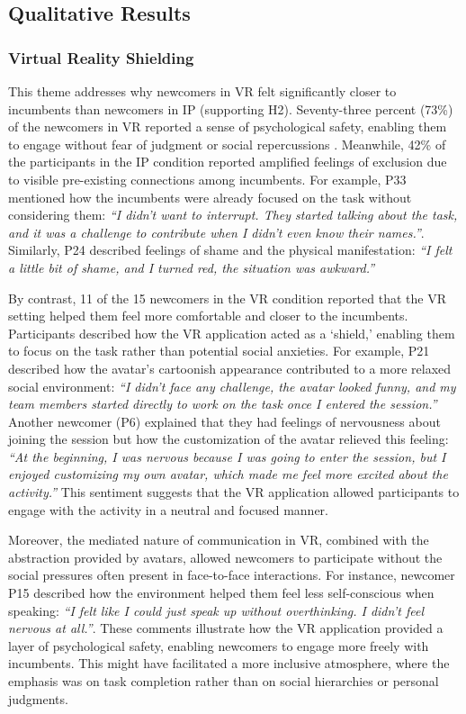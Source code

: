 \subsection{Qualitative Results}

\subsubsection{Virtual Reality Shielding}
This theme addresses why newcomers in VR felt significantly closer to incumbents than newcomers in IP (supporting H2). Seventy-three percent (73\%) of the newcomers in VR reported a sense of psychological safety, enabling them to engage without fear of judgment or social repercussions \cite{edmondson2014psychological}. Meanwhile, 42\% of the participants in the IP condition reported amplified feelings of exclusion due to visible pre-existing connections among incumbents. For example, P33 mentioned how the incumbents were already focused on the task without considering them: \textit{``I didn't want to interrupt. They started talking about the task, and it was a challenge to contribute when I didn't even know their names.''}. Similarly, P24 described feelings of shame and the physical manifestation: \textit{``I felt a little bit of shame, and I turned red, the situation was awkward.''} 

By contrast, 11 of the 15 newcomers in the VR condition reported that the VR setting helped them feel more comfortable and closer to the incumbents. Participants described how the VR application acted as a `shield,' enabling them to focus on the task rather than potential social anxieties. For example, P21 described how the avatar's cartoonish appearance contributed to a more relaxed social environment: \textit{``I didn't face any challenge, the avatar looked funny, and my team members started directly to work on the task once I entered the session.''} Another newcomer (P6) explained that they had feelings of nervousness about joining the session but how the customization of the avatar relieved this feeling: \textit{``At the beginning, I was nervous because I was going to enter the session, but I enjoyed customizing my own avatar, which made me feel more excited about the activity.''} This sentiment suggests that the VR application allowed participants to engage with the activity in a neutral and focused manner.

Moreover, the mediated nature of communication in VR, combined with the abstraction provided by avatars, allowed newcomers to participate without the social pressures often present in face-to-face interactions. For instance, newcomer P15 described how the environment helped them feel less self-conscious when speaking: \textit{``I felt like I could just speak up without overthinking. I didn't feel nervous at all.''}. These comments illustrate how the VR application provided a layer of psychological safety, enabling newcomers to engage more freely with incumbents. This might have facilitated a more inclusive atmosphere, where the emphasis was on task completion rather than on social hierarchies or personal judgments.

